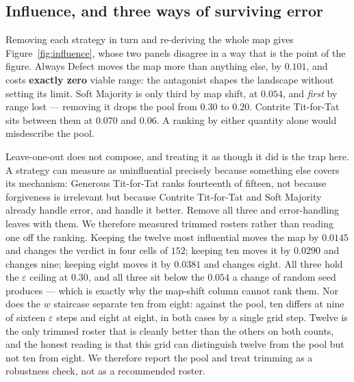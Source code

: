 \documentclass[11pt,a4paper]{article}
\newcommand{\eps}{\varepsilon}
\begin{document}
\FloatBarrier
\subsection{Influence, and three ways of surviving error}
\label{sec:influence}

Removing each strategy in turn and re-deriving the whole map gives
Figure~\ref{fig:influence}, whose two panels disagree in a way that is the point
of the figure. Always Defect moves the map more than anything else, by
$\mathbf{0.101}$, and costs \textbf{exactly zero} viable range: the antagonist
shapes the landscape without setting its limit. Soft Majority is only third by
map shift, at $0.054$, and \emph{first} by range lost --- removing it drops the
pool from $0.30$ to $\mathbf{0.20}$. Contrite Tit-for-Tat sits between them at
$0.070$ and $0.06$. A ranking by either quantity alone would misdescribe the
pool.

Leave-one-out does not compose, and treating it as though it did is the trap
here. A strategy can measure as uninfluential precisely because something else
covers its mechanism: Generous Tit-for-Tat ranks fourteenth of fifteen, not
because forgiveness is irrelevant but because Contrite Tit-for-Tat and Soft
Majority already handle error, and handle it better. Remove all three and
error-handling leaves with them. We therefore measured trimmed rosters rather
than reading one off the ranking. Keeping the twelve most influential moves the
map by $0.0145$ and changes the verdict in four cells of $152$; keeping ten
moves it by $0.0290$ and changes nine; keeping eight moves it by $0.0381$ and
changes eight. All three hold the $\eps$ ceiling at $0.30$, and all three sit
below the $0.054$ a change of random seed produces --- which is exactly why the
map-shift column cannot rank them. Nor does the $w$ staircase separate ten from
eight: against the pool, ten differs at nine of sixteen $\eps$ steps and eight
at eight, in both cases by a single grid step. Twelve is the only trimmed
roster that is cleanly better than the others on both counts, and the honest
reading is that this grid can distinguish twelve from the pool but not ten from
eight. We therefore report the pool and treat trimming as a robustness check,
not as a recommended roster.
\end{document}
